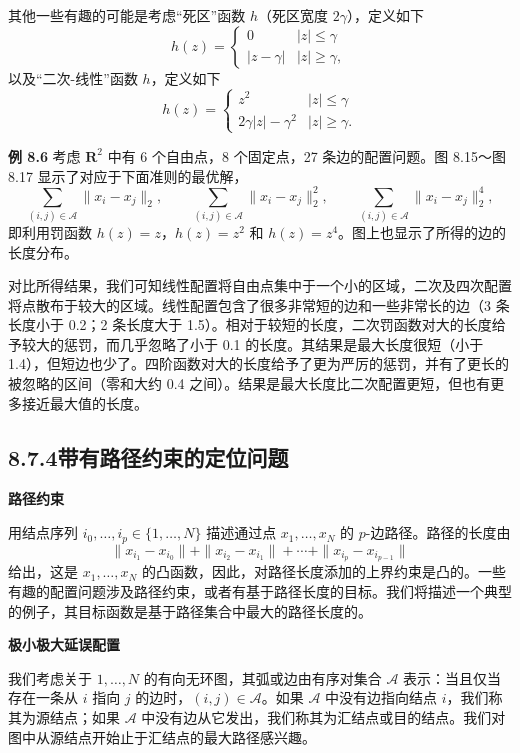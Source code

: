 \documentclass[UTF8,12pt,a4paper,fontset=fandol]{ctexart}
\begin{document}
其他一些有趣的可能是考虑“死区”函数 $h$（死区宽度 $2\gamma$），定义如下
\[
h(z)=
\begin{cases}
0 & |z|\leq \gamma\\
|z-\gamma| & |z|\geq \gamma,
\end{cases}
\]
以及“二次-线性”函数 $h$，定义如下
\[
h(z)=
\begin{cases}
z^2 & |z|\leq \gamma\\
2\gamma |z|-\gamma^2 & |z|\geq \gamma.
\end{cases}
\]

\noindent\textbf{例 8.6}\quad
考虑 $\mathbf{R}^2$ 中有 6 个自由点，8 个固定点，27 条边的配置问题。图 8.15～图 8.17 显示了对应于下面准则的最优解，
\[
\sum_{(i,j)\in\mathcal A}\|x_i-x_j\|_2,\qquad
\sum_{(i,j)\in\mathcal A}\|x_i-x_j\|_2^2,\qquad
\sum_{(i,j)\in\mathcal A}\|x_i-x_j\|_2^4,
\]
即利用罚函数 $h(z)=z$，$h(z)=z^2$ 和 $h(z)=z^4$。图上也显示了所得的边的长度分布。

对比所得结果，我们可知线性配置将自由点集中于一个小的区域，二次及四次配置将点散布于较大的区域。线性配置包含了很多非常短的边和一些非常长的边（3 条长度小于 0.2；2 条长度大于 1.5）。相对于较短的长度，二次罚函数对大的长度给予较大的惩罚，而几乎忽略了小于 0.1 的长度。其结果是最大长度很短（小于 1.4），但短边也少了。四阶函数对大的长度给予了更为严厉的惩罚，并有了更长的被忽略的区间（零和大约 0.4 之间）。结果是最大长度比二次配置更短，但也有更多接近最大值的长度。

\subsection*{8.7.4\quad 带有路径约束的定位问题}

\noindent\textbf{路径约束}

用结点序列 $i_0,\ldots,i_p\in\{1,\ldots,N\}$ 描述通过点 $x_1,\ldots,x_N$ 的 $p$-边路径。路径的长度由
\[
\|x_{i_1}-x_{i_0}\|+\|x_{i_2}-x_{i_1}\|+\cdots+\|x_{i_p}-x_{i_{p-1}}\|
\]
给出，这是 $x_1,\ldots,x_N$ 的凸函数，因此，对路径长度添加的上界约束是凸的。一些有趣的配置问题涉及路径约束，或者有基于路径长度的目标。我们将描述一个典型的例子，其目标函数是基于路径集合中最大的路径长度的。

\noindent\textbf{极小极大延误配置}

我们考虑关于 $1,\ldots,N$ 的有向无环图，其弧或边由有序对集合 $\mathcal A$ 表示：当且仅当存在一条从 $i$ 指向 $j$ 的边时，$(i,j)\in\mathcal A$。如果 $\mathcal A$ 中没有边指向结点 $i$，我们称其为源结点；如果 $\mathcal A$ 中没有边从它发出，我们称其为汇结点或目的结点。我们对图中从源结点开始止于汇结点的最大路径感兴趣。
\end{document}
